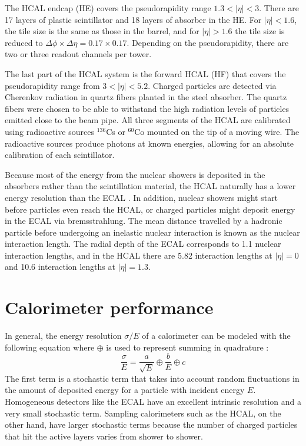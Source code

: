 The HCAL endcap (HE) covers the pseudorapidity range $1.3 < |\eta| < 3$. There are 17 layers of plastic scintillator and 18 layers of absorber in the HE. For $|\eta| < 1.6$, the tile size is the same as those in the barrel, and for $|\eta| >1.6$ the tile size is reduced to $\Delta\phi \times \Delta\eta = 0.17 \times 0.17$. Depending on the pseudorapidity, there are two or three readout channels per tower.
 
The last part of the HCAL system is the forward HCAL (HF) that covers the pseudorapidity range from $3 < |\eta| < 5.2$. Charged particles are detected via Cherenkov radiation in quartz fibers planted in the steel absorber. The quartz fibers were chosen to be able to withstand the high radiation levels of particles emitted close to the beam pipe. 
All three segments of the HCAL are calibrated using radioactive sources $^{136}$Cs or $^{60}$Co mounted on the tip of a moving wire. The radioactive sources produce photons at known energies, allowing for an absolute calibration of each scintillator. 

Because most of the energy from the nuclear showers is deposited in the absorbers rather than the scintillation material, 
the HCAL naturally has a lower energy resolution than the ECAL . In addition, nuclear showers might start 
before particles even reach the HCAL, or charged particles might deposit energy in the ECAL via bremsstrahlung. 
The mean distance travelled by a hadronic particle before undergoing 
an inelastic nuclear interaction is known as the nuclear interaction length. 
The radial depth of the ECAL corresponds to 1.1 nuclear interaction lengths, and
in the HCAL there are 5.82 interaction lengths at $|\eta|=0$ and 10.6 interaction lengths at $|\eta|=1.3$. 




\section{Calorimeter performance}
In general, the energy resolution $\sigma/E$ of a calorimeter can be modeled with the following equation where $\oplus$ is used to represent summing in quadrature \cite{Calo}:
\begin{equation}
\frac{\sigma}{E} = \frac{a}{\sqrt{E}} \oplus \frac{b}{E}  \oplus c 
\end{equation}
The first term is a stochastic term that takes into account random fluctuations in the amount of deposited energy for a particle with incident energy $E$. Homogeneous detectors like the ECAL have an excellent intrinsic resolution and a very small stochastic term. Sampling calorimeters such as the HCAL, on the other hand, have larger stochastic terms because the number of charged particles that hit the active layers varies from shower to shower.

